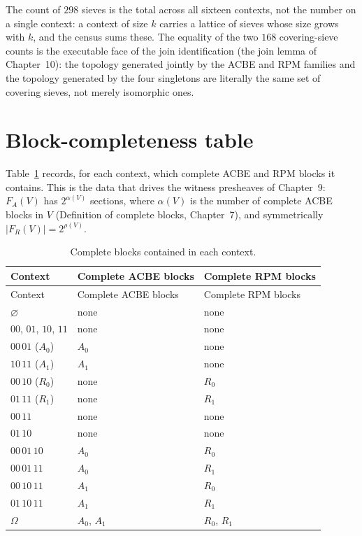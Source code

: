 \begin{remark}\label{appB:sieveremark}
The count of $298$ sieves is the total across all sixteen contexts, not the
number on a single context: a context of size $k$ carries a lattice of sieves
whose size grows with $k$, and the census sums these. The equality of the two
$168$ covering-sieve counts is the executable face of the join identification
(the join lemma of Chapter~10): the topology generated jointly by the ACBE and
RPM families and the topology generated by the four singletons are literally the
same set of covering sieves, not merely isomorphic ones.
\end{remark}

\section{Block-completeness table}\label{appB:blocks}

Table~\ref{appB:blocktable} records, for each context, which complete ACBE and
RPM blocks it contains. This is the data that drives the witness presheaves of
Chapter~9: $F_A(V)$ has $2^{\alpha(V)}$ sections, where $\alpha(V)$ is the
number of complete ACBE blocks in $V$ (Definition of complete blocks,
Chapter~7), and symmetrically $|F_R(V)| = 2^{\rho(V)}$.

\begin{longtable}{@{}lll@{}}
\caption{Complete blocks contained in each context.}\label{appB:blocktable}\\
\toprule
Context & Complete ACBE blocks & Complete RPM blocks \\
\midrule
\endfirsthead
\toprule
Context & Complete ACBE blocks & Complete RPM blocks \\
\midrule
\endhead
\bottomrule
\endfoot
$\varnothing$ & none & none \\
$00$, $01$, $10$, $11$ & none & none \\
$00\,01$ ($A_0$) & $A_0$ & none \\
$10\,11$ ($A_1$) & $A_1$ & none \\
$00\,10$ ($R_0$) & none & $R_0$ \\
$01\,11$ ($R_1$) & none & $R_1$ \\
$00\,11$ & none & none \\
$01\,10$ & none & none \\
$00\,01\,10$ & $A_0$ & $R_0$ \\
$00\,01\,11$ & $A_0$ & $R_1$ \\
$00\,10\,11$ & $A_1$ & $R_0$ \\
$01\,10\,11$ & $A_1$ & $R_1$ \\
$\Omega$ & $A_0$, $A_1$ & $R_0$, $R_1$ \\
\bottomrule
\end{longtable}

